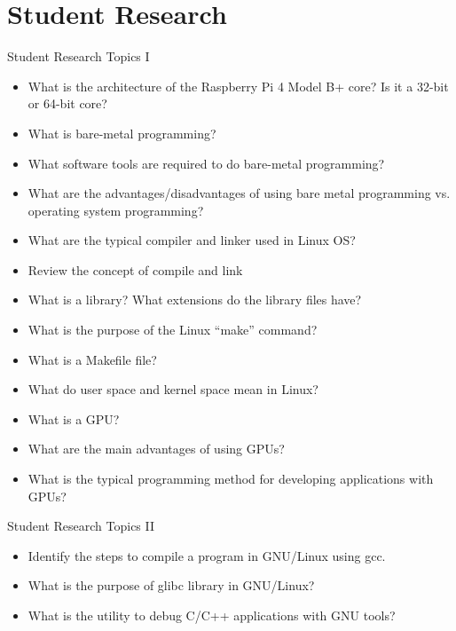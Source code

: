 \section{Student Research}
\begin{frame}{Student Research Topics I}
 \begin{itemize}
    \item What is the architecture of the Raspberry Pi 4 Model B+ core? Is it a 32-bit or 64-bit core?
    \item What is bare-metal programming?
    \item What software tools are required to do bare-metal programming?
    \item What are the advantages/disadvantages of using bare metal programming vs. operating system programming?
    \item What are the typical compiler and linker used in Linux OS?
    \item Review the concept of compile and link
    \item What is a library? What extensions do the library files have?
    \item What is the purpose of the Linux “make” command?
    \item What is a Makefile file?
    \item What do user space and kernel space mean in Linux?
    \item What is a GPU?
    \item What are the main advantages of using GPUs?
    \item What is the typical programming method for developing applications with GPUs?
\end{itemize}
\end{frame}


\begin{frame}{Student Research Topics II}
 \begin{itemize}
    \item Identify the steps to compile a program in GNU/Linux using gcc.
    \item What is the purpose of glibc library in GNU/Linux?
    \item What is the utility to debug C/C++ applications with GNU tools? 
\end{itemize}
\end{frame}